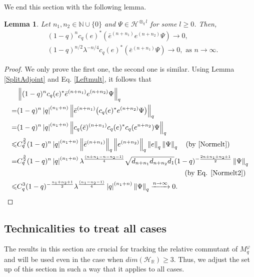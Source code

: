 \documentclass[12pt, a4paper,reqno]{amsart}
\newtheorem{Lemma}[Theorem]{Lemma}
\theoremstyle{definition}
\renewcommand{\leq}{\leqslant}
\renewcommand{\geq}{\geqslant}
\def\R{\mathbb R}
\newcommand{\CH}{\mathcal{H}}
\newcommand{\norm}[1]{\left\Vert#1\right\Vert}
\newcommand{\abs}[1]{\left\vert#1\right\vert}
\begin{document}
We end this section with the following lemma. 

\begin{Lemma}\label{lim}
Let $ n_1, n_2  \in \mathbb N\cup\{0\}$ and 	$ \Psi \in \CH^{\otimes_q l }$ for some $l\geq0$. Then, 
\begin{align*}
&(1-q)^n c_q(e)^* (\bar{e}^{(n +n_1)} e^{ (n + n_2)}  \Psi) \rightarrow 0,\\
&(1-q)^{n/2} \lambda^{-n/4}c_q(e)^* (\bar{e}^{(n +n_1)} \Psi) \rightarrow 0, \text{ as } n\rightarrow\infty.
\end{align*}
\end{Lemma}

\begin{proof}
We only prove the first one, the second one is similar. Using Lemma \ref{SplitAdjoint} and Eq. \eqref{Leftmult}, it follows that 
\begin{align*}
&\norm{(1-q)^n c_q(e)^* \bar{e}^{(n +n_1)}   e^{   (n + n_2)}   \Psi }_q\\
=&(1-q)^n   \abs{q}^{(n_1 + n)}  \norm{ \bar{e}^{ (n +n_1)}  \big( c_q(e)^*  e^{   (n + n_2)}   \Psi \big)}_q\\
= & (1-q)^n   \abs{q}^{(n_1 + n)}\norm{ c_q(\bar{e})^{(n +n_1)} c_q(e)^* c_q(e^{n+n_2}) \Psi }_q\\
\leq &C_q^{\frac{3}{2}}  (1-q)^n   \abs{q}^{(n_1 + n)} \norm{\bar{e}^{( n+ n_1)}}_q  \norm{e^{( n+ n_2) }}_q\norm{e}_q\norm{\Psi}_q \quad (\text{by \eqref{Normelt}})\\
= &  C_q^{\frac{3}{2}}  (1-q)^n   \abs{q}^{(n_1 + n)} \lambda^{\frac{(n+n_1- n- n_2 -1)}{4} }\sqrt{d_{n+n_1} d_{n+n_2}d_1} (1-q)^{-\frac{2n+n_1+n_2+1}{2}} \norm{\Psi}_q\\
&\quad\quad\quad\quad\quad\quad\quad\quad\quad\quad\quad\quad\quad\quad\quad\quad\quad\quad\quad\quad\quad\quad\quad\quad (\text{by Eq. \eqref{Normelt2}})\\
\leq &  C_q^3 (1 -q)^{-\frac{ n_1+n_2 +1}{2}} \lambda^{\frac{(n_1- n_2 -1)}{4} }\abs{q}^{(n_1 + n)} \norm{\Psi}_q \xrightarrow{ n \rightarrow \infty} 0.
\end{align*}
\end{proof}	



\subsection{Technicalities to treat all cases}\label{casebig3}


The results in this section are crucial for tracking the relative commutant of $M_q^\varphi$ and will be used even in the case when $dim(\CH_\R)\geq 3$. Thus, we adjust the set up of this section in such a way that it applies to all cases.
\end{document}
